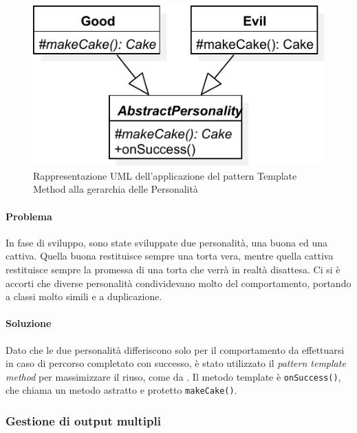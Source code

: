 \documentclass[a4paper,12pt]{report}
\begin{document}
\begin{figure}[H]
\centering{}
\includegraphics[width=\textwidth]{img/template}
\caption{Rappresentazione UML dell'applicazione del pattern Template Method alla gerarchia delle Personalità}
\label{img:template}
\end{figure}

\paragraph{Problema} In fase di sviluppo, sono state sviluppate due personalità, una buona ed una cattiva.
Quella buona restituisce sempre una torta vera, mentre quella cattiva restituisce sempre la
promessa di una torta che verrà in realtà disattesa.
Ci si è accorti che diverse personalità condividevano molto del comportamento,
portando a classi molto simili e a duplicazione.

\paragraph{Soluzione} Dato che le due personalità differiscono solo per il comportamento da effettuarsi in caso di percorso completato con successo,
è stato utilizzato il \textit{pattern template method} per massimizzare il riuso, come da .
Il metodo template è \texttt{onSuccess()}, che chiama un metodo astratto e protetto
\texttt{makeCake()}.

\subsubsection{Gestione di output multipli}
\end{document}

